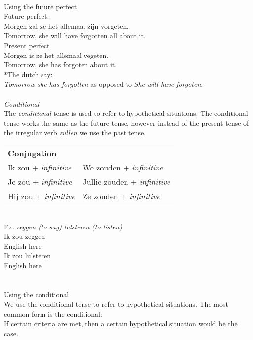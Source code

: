 \documentclass[letterpaper,11pt]{article}
\begin{document}
\\
Using the future perfect \\
Future perfect: \\ 
Morgen zal ze het allemaal zijn vorgeten. \\
Tomorrow, she will have forgotten all about it. \\
Present perfect \\ 
Morgen is ze het allemaal vegeten. \\
Tomorrow, she has forgoten about it. \\
*The dutch say: \\
\textit{Tomorrow she has forgotten} as opposed to \textit{She will have forgoten}.
\\ \\ 
\textit{Conditional} \\
The \textit{conditional} tense is used to refer to hypothetical situations. The
conditional tense works the same as the future tense, however instead of the
present tense of the irregular verb \textit{zullen} we use the past tense. \\
\begin{tabular}[t]{l l}
    \textbf{Conjugation} \\
    Ik zou + \textit{infinitive} & We zouden + \textit{infinitive} \\
    Je zou + \textit{infinitive} & Jullie zouden + \textit{infinitive} \\
    Hij zou + \textit{infinitive} & Ze zouden + \textit{infinitive} \\
\end{tabular} 
\\
Ex: \textit{zeggen (to say) lulsteren (to listen)} \\
Ik zou zeggen \\ %
English here \\
Ik zou lulsteren \\
English here \\
\\ \\ 
Using the conditional \\ 
We use the conditional tense to refer to hypothetical situations. The most
common form is the conditional: \\ 
If certain criteria are met, then a certain hypothetical situation would be the
case. \\
\end{document}
